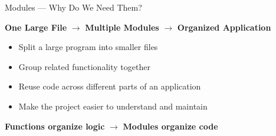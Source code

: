 \begin{frame}{Modules — Why Do We Need Them?}

    \begin{center}
        \Large
        \textbf{One Large File}
        $\longrightarrow$
        \textbf{Multiple Modules}
        $\longrightarrow$
        \textbf{Organized Application}
    \end{center}

    \vspace{0.8cm}

    \begin{itemize}
        \item Split a large program into smaller files
        \item Group related functionality together
        \item Reuse code across different parts of an application
        \item Make the project easier to understand and maintain
    \end{itemize}

    \vfill

    \begin{center}
        \Large
        \textbf{Functions organize logic}
        \quad $\rightarrow$ \quad
        \textbf{Modules organize code}
    \end{center}

\end{frame}